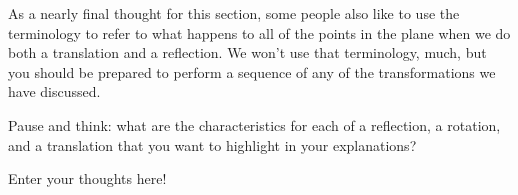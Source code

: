 \documentclass{ximera}
\begin{document}
As a nearly final thought for this section, some people also like to use the terminology  to refer to what happens to all of the points in the plane when we do both a translation and a reflection. We won't use that terminology, much, but you should be prepared to perform a sequence of any of the transformations we have discussed.


\begin{question}
Pause and think: what are the characteristics for each of a reflection, a rotation, and a translation that you want to highlight in your explanations?
\begin{freeResponse}
Enter your thoughts here!
\end{freeResponse}
\end{question}
\end{document}
